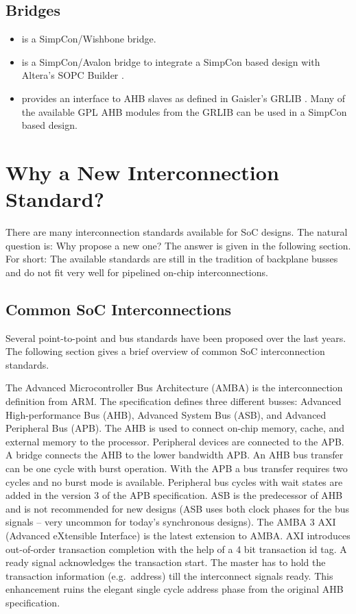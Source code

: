 \subsection{Bridges}

\begin{itemize}
    \item {} is a SimpCon/Wishbone \cite{soc:wishbone}
    bridge.
    \item {} is a SimpCon/Avalon \cite{soc:avalon}
    bridge to integrate a SimpCon based design with Altera's SOPC
    Builder \cite{quartus}.
    \item {} provides an interface to AHB slaves as
    defined in Gaisler's GRLIB \cite{grlib}. Many of the available
    GPL AHB modules from the GRLIB can be used in a SimpCon based
    design.
\end{itemize}


\section{Why a New Interconnection Standard?}

There are many interconnection standards available for SoC designs.
The natural question is: Why propose a new one? The answer is given
in the following section. For short: The available standards are
still in the tradition of backplane busses and do not fit very well
for pipelined on-chip interconnections.

\subsection{Common SoC Interconnections}


Several point-to-point and bus standards have been proposed over the
last years. The following section gives a brief overview of common
SoC interconnection standards.

The Advanced Microcontroller Bus Architecture (AMBA) \cite{soc:amba}
is the interconnection definition from ARM. The specification
defines three different busses: Advanced High-performance Bus (AHB),
Advanced System Bus (ASB), and Advanced Peripheral Bus (APB). The
AHB is used to connect on-chip memory, cache, and external memory to
the processor. Peripheral devices are connected to the APB. A bridge
connects the AHB to the lower bandwidth APB. An AHB bus transfer can
be one cycle with burst operation. With the APB a bus transfer
requires two cycles and no burst mode is available. Peripheral bus
cycles with wait states are added in the version 3 of the APB
specification. ASB is the predecessor of AHB and is not recommended
for new designs (ASB uses both clock phases for the bus signals --
very uncommon for today's synchronous designs). The AMBA 3 AXI
(Advanced eXtensible Interface) \cite{soc:amba3} is the latest
extension to AMBA. AXI introduces out-of-order transaction
completion with the help of a 4 bit transaction id tag. A ready
signal acknowledges the transaction start. The master has to hold
the transaction information (e.g.\ address) till the interconnect
signals ready. This enhancement ruins the elegant single cycle
address phase from the original AHB specification.

